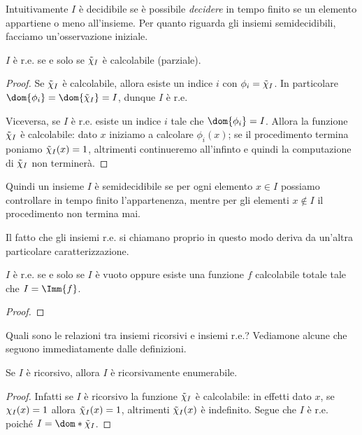 Intuitivamente $I$ è decidibile se è possibile \emph{decidere} in tempo finito se un elemento appartiene o meno all'insieme. Per quanto riguarda gli insiemi semidecidibili, facciamo un'osservazione iniziale.

\begin{remark}
    $I$ è r.e. se e solo se $\tilde{\chi}_{I}$ è calcolabile (parziale).
    \begin{proof}
        Se $\tilde{\chi}_{I}$ è calcolabile, allora esiste un indice $i$ con $\phi_i = \tilde{\chi}_{I}$. In particolare $\dom{\phi_i} = \dom{\scharf{I}} = I$, dunque $I$ è r.e.
        
        Viceversa, se $I$ è r.e. esiste un indice $i$ tale che $\dom{\phi_i} = I$. Allora la funzione $\tilde{\chi}_{I}$ è calcolabile: dato $x$ iniziamo a calcolare $\phi_{i}(x)$; se il procedimento termina poniamo $\tilde{\chi}_{I}(x) = 1$, altrimenti continueremo all'infinto e quindi la computazione di $\tilde{\chi}_{I}$ non terminerà.   
    \end{proof} 
\end{remark}

Quindi un insieme $I$ è semidecidibile se per ogni elemento $x \in I$ possiamo controllare in tempo finito l'appartenenza, mentre per gli elementi $x \notin I$ il procedimento non termina mai.

Il fatto che gli insiemi r.e. si chiamano proprio in questo modo deriva da un'altra particolare caratterizzazione.

\begin{proposition}
    $I$ è r.e. se e solo se $I$ è vuoto oppure esiste una funzione $f$ calcolabile totale tale che $I = \Imm{f}$.  
\end{proposition}
\begin{proof}
\end{proof}

Quali sono le relazioni tra insiemi ricorsivi e insiemi r.e.? Vediamone alcune che seguono immediatamente dalle definizioni.

\begin{proposition}
    [$\R \subseteq \RE$]
    Se $I$ è ricorsivo, allora $I$ è ricorsivamente enumerabile.
\end{proposition}
\begin{proof}
    Infatti se $I$ è ricorsivo la funzione $\tilde{\chi}_{I}$ è calcolabile: in effetti dato $x$, se $\chi_{I}(x) = 1$ allora $\tilde{\chi}_{I}(x) = 1$, altrimenti $\tilde{\chi}_{I}(x)$ è indefinito. 
    Segue che $I$ è r.e. poiché $I = \dom*{\scharf{I}}$. 
\end{proof}

